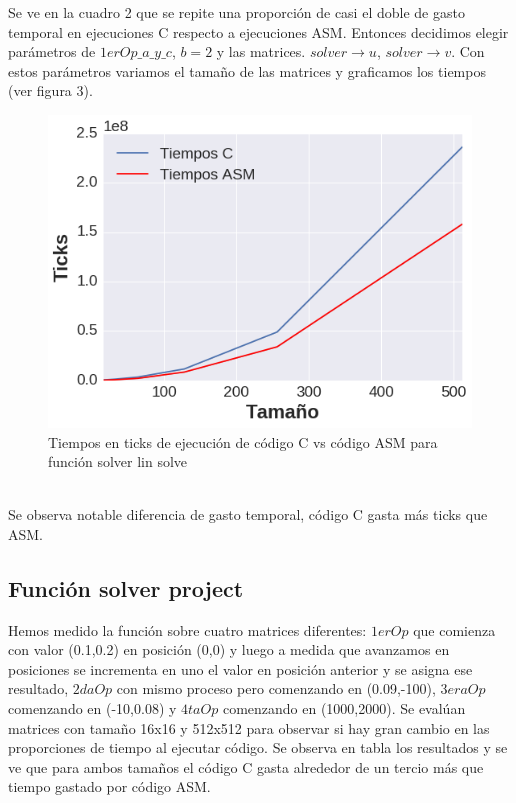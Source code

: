  Se ve en la cuadro 2 que se repite una proporción de casi el doble de gasto temporal en ejecuciones C respecto a ejecuciones ASM. Entonces decidimos elegir parámetros de $1erOp\_a\_y\_c$, $b = 2$ y las matrices. $solver\rightarrow u$, $solver\rightarrow v$.
 Con estos parámetros variamos el tamaño de las matrices y graficamos los tiempos (ver figura 3).
\begin{figure}[h]

\centering
\includegraphics[scale=0.6] {solver_lin_solve}
  
 \caption{Tiempos en ticks de ejecución de código C vs código ASM para función solver lin solve}
\end{figure} \\
Se observa notable diferencia de gasto temporal, código C gasta más ticks que ASM.

\subsection{Función solver project}
Hemos medido la función sobre cuatro matrices diferentes: $1erOp$ que comienza con valor (0.1,0.2) en posición (0,0) y luego a medida que avanzamos en posiciones se incrementa en uno el valor en posición anterior y se asigna ese resultado, $2daOp$ con mismo proceso pero comenzando en (0.09,-100), $3eraOp$ comenzando en (-10,0.08) y $4taOp$ comenzando en (1000,2000). Se evalúan matrices con tamaño 16x16 y 512x512 para observar si hay gran cambio en las proporciones de tiempo al ejecutar código. Se observa en tabla los resultados y se ve que 
para ambos tamaños el código C gasta alrededor de un tercio más que tiempo gastado por código ASM. 
 

